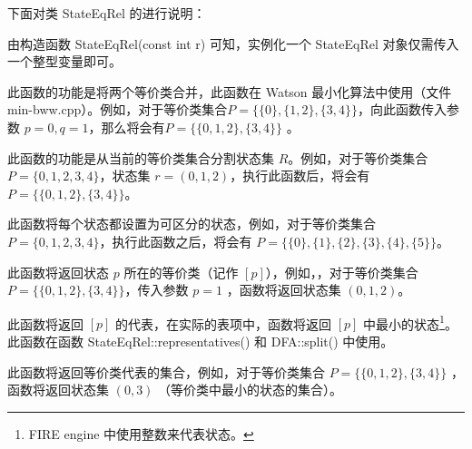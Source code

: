 下面对类 StateEqRel 的进行说明：

\begin{remark}
    由构造函数 StateEqRel(const int r) 可知，实例化一个 StateEqRel 对象仅需传入一个整型变量即可。
\end{remark}

\begin{remark}
    此函数的功能是将两个等价类合并，此函数在 Watson 最小化算法中使用（文件 min-bww.cpp）。例如，对于等价类集合$P=\{ \{ 0\}, \{ 1,2 \},\{3,4 \} \}$，向此函数传入参数 $p=0,q=1$，那么将会有$P = \{ \{ 0,1,2 \},\{3,4 \} \}$ 。
\end{remark}

\begin{remark}
    此函数的功能是从当前的等价类集合分割状态集 $R$。例如，对于等价类集合 $P=\{0,1,2 ,3,4\}$，状态集 $r=(0,1,2)$，执行此函数后，将会有$ P=\{ \{ 0,1,2\} , \{ 3,4 \} \} $。
\end{remark}

\begin{remark}[函数 identity()]
    此函数将每个状态都设置为可区分的状态，例如，对于等价类集合 $ P=\{ 0,1,2,3,4 \} $，执行此函数之后，将会有 $ P= \{ \{ 0\}, \{ 1\}, \{ 2\}, \{ 3\}, \{ 4\}, \{ 5\}\} $。
\end{remark}

\begin{remark}
    此函数将返回状态 $p$ 所在的等价类（记作 $[p]$），例如，，对于等价类集合  $ P=\{ \{ 0,1,2 \} , \{ 3,4\} \} $，传入参数 $p=1$ ，函数将返回状态集 $(0,1,2)$。
\end{remark}

\begin{remark}
    此函数将返回 $[p]$ 的代表，在实际的表项中，函数将返回 $[p]$ 中最小的状态\footnote{FIRE engine 中使用整数来代表状态。}。此函数在函数 StateEqRel::representatives() 和 DFA::split() 中使用。
\end{remark}

\begin{remark}[函数 representatives()]
    此函数将返回等价类代表的集合，例如，对于等价类集合  $ P=\{ \{ 0,1,2 \} , \{ 3,4\} \} $ ，函数将返回状态集 $(0,3)$ （等价类中最小的状态的集合）。
\end{remark}